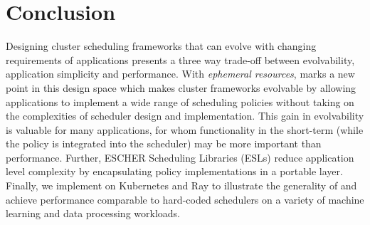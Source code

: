 \section{Conclusion}

Designing cluster scheduling frameworks that can evolve with changing requirements of applications presents a three way trade-off between evolvability, application simplicity and performance. 
With \textit{ephemeral resources}, \name{} marks a new point in this design space which makes cluster frameworks evolvable by allowing applications to implement a wide range of scheduling policies without taking on the complexities of scheduler design and implementation. This gain in evolvability is valuable for many applications, for whom functionality in the short-term (while the policy is integrated into the scheduler) may be more important than performance. %
Further, ESCHER Scheduling Libraries (ESLs) reduce application level complexity by encapsulating policy implementations in a portable layer. Finally, we implement \name{} on Kubernetes and Ray to illustrate the generality of \name{} and achieve performance comparable to hard-coded schedulers on a variety of machine learning and data processing workloads. 


